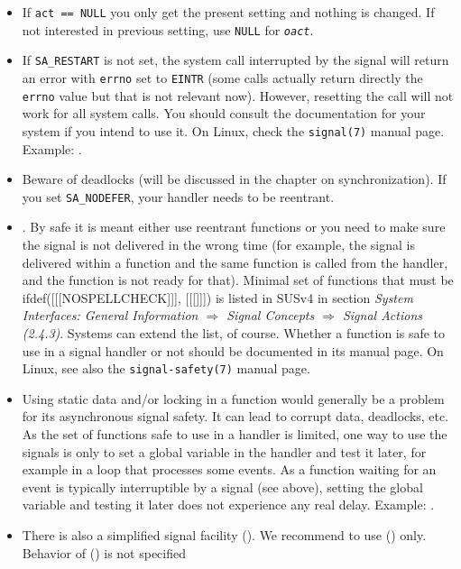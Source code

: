 \begin{itemize}
\item If \texttt{act == NULL} you only get the present setting and nothing is
changed.  If not interested in previous setting, use \texttt{NULL} for
\emph{\texttt{oact}}.
\item If \texttt{SA\_RESTART} is not set, the system call interrupted by the
signal will return an error with \texttt{errno} set to \texttt{EINTR} (some
calls actually return directly the \texttt{errno} value but that is not relevant
now).  However, resetting the call will not work for all system calls.  You
should consult the documentation for your system if you intend to use it.
On Linux, check the \texttt{signal(7)} manual page.  Example:
.
\item Beware of deadlocks (will be discussed in the chapter on synchronization).
If you set \texttt{SA\_NODEFER}, your handler needs to be reentrant.
\item \label{ASYNCSIGNALSAFE} .  By safe it is meant either use reentrant functions or you need
to make sure the signal is not delivered in the wrong time (for example, the
signal is delivered within a function and the same function is called from the
handler, and the function is not ready for that).  Minimal set of functions
that must be ifdef([[[NOSPELLCHECK]]], [[[]]])
is listed in SUSv4 in section \emph{System Interfaces: General Information
$\Rightarrow$ Signal Concepts $\Rightarrow$ Signal Actions (2.4.3)}.  Systems
can extend the list, of course.  Whether a function is safe to use in a signal
handler or not should be documented in its manual page.  On Linux, see also
the \texttt{signal-safety(7)} manual page.
\item Using static data and/or locking in a function would generally be a
problem for its asynchronous signal safety.  It can lead to corrupt data,
deadlocks, etc.  As the set of functions safe to use in a handler is limited,
one way to use the signals is only to set a global variable in the handler and
test it later, for example in a loop that processes some events.  As a function
waiting for an event is typically interruptible by a signal (see above), setting
the global variable and testing it later does not experience any real delay.
Example: .
\item There is also a simplified signal facility ().  We recommend
to use () only.  Behavior of () is not specified

\end{itemize}
